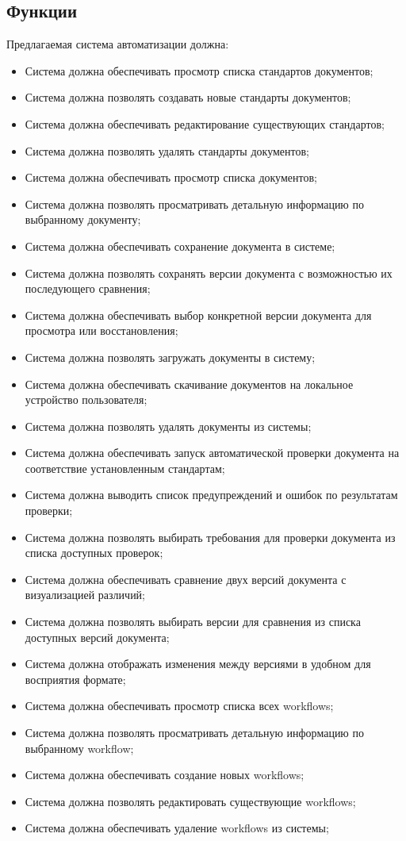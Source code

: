 \subsection{Функции}
Предлагаемая система автоматизации должна:
\begin{itemize}[nosep, leftmargin=*, labelindent=\parindent]
  \item Система должна обеспечивать просмотр списка стандартов документов;
  \item Система должна позволять создавать новые стандарты документов;
  \item Система должна обеспечивать редактирование существующих стандартов;
  \item Система должна позволять удалять стандарты документов;
  \item Система должна обеспечивать просмотр списка документов;
  \item Система должна позволять просматривать детальную информацию по выбранному документу;
  \item Система должна обеспечивать сохранение документа в системе;
  \item Система должна позволять сохранять версии документа с возможностью их последующего сравнения;
  \item Система должна обеспечивать выбор конкретной версии документа для просмотра или восстановления;
  \item Система должна позволять загружать документы в систему;
  \item Система должна обеспечивать скачивание документов на локальное устройство пользователя;
  \item Система должна позволять удалять документы из системы;
  \item Система должна обеспечивать запуск автоматической проверки документа на соответствие установленным стандартам;
  \item Система должна выводить список предупреждений и ошибок по результатам проверки;
  \item Система должна позволять выбирать требования для проверки документа из списка доступных проверок;
  \item Система должна обеспечивать сравнение двух версий документа с визуализацией различий;
  \item Система должна позволять выбирать версии для сравнения из списка доступных версий документа;
  \item Система должна отображать изменения между версиями в удобном для восприятия формате;
  \item Система должна обеспечивать просмотр списка всех workflows;
  \item Система должна позволять просматривать детальную информацию по выбранному workflow;
  \item Система должна обеспечивать создание новых workflows;
  \item Система должна позволять редактировать существующие workflows;
  \item Система должна обеспечивать удаление workflows из системы;
\end{itemize}

